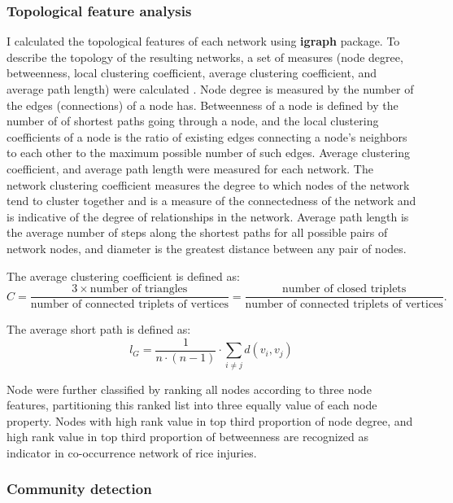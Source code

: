 \subsubsection{Topological feature analysis}

I calculated the topological features of each network using \textbf{igraph} package. To describe the topology of the resulting networks, a set of measures (node degree, betweenness, local clustering coefficient, average clustering coefficient, and average path length) were calculated \citep{Newman_2006_Modularity}. Node degree is measured by the number of the edges (connections) of a node has. Betweenness of a node is defined by the number of of shortest paths going through a node, and the local clustering coefficients of a node is the ratio of existing edges connecting a node's neighbors to each other to the maximum possible number of such edges. Average clustering coefficient, and average path length were measured for each network. The network clustering coefficient measures the degree to which nodes of the network tend to cluster together and is a measure of the connectedness of the network and is indicative of the degree of relationships in the network. Average path length is the average number of steps along the shortest paths for all possible pairs of network nodes, and diameter is the greatest distance between any pair of nodes. 


The average clustering coefficient is defined as:
\begin{equation}
C = \frac{3 \times \mbox{number of triangles}}{\mbox{number of connected triplets of vertices}} = \frac{\mbox{number of closed triplets}}{\mbox{number of connected triplets of vertices}}.
\end{equation}

The average short path is defined as:
\begin{equation}
l_G = \frac{1}{n \cdot (n - 1)} \cdot \sum_{i \ne j} d(v_i, v_j)
\end{equation}

Node were further classified by ranking all nodes according to three node features, partitioning this ranked list into three equally value of each node property. Nodes with high rank value in top third proportion of node degree, and high rank value in top third proportion of betweenness are recognized as indicator in co-occurrence network of rice injuries. 


\subsubsection{Community detection}

